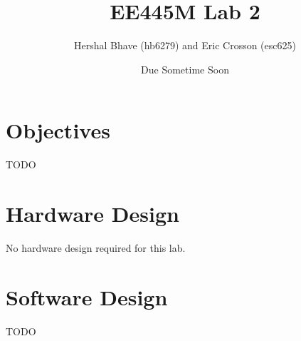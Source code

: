 \documentclass[12pt]{article}
\title{EE445M Lab 2}
\author{Hershal Bhave (hb6279) and Eric Crosson (esc625)}
\date{Due Sometime Soon}
\begin{document}
\maketitle

\section{Objectives}
{\huge \color{red} TODO}

\section{Hardware Design}
No hardware design required for this lab.

\section{Software Design}
{\huge \color{red} TODO}
\end{document}
